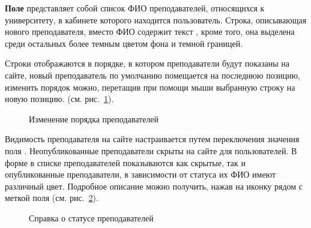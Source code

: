 \textbf{Поле } представляет собой список ФИО преподавателей, относящихся к университету, в кабинете которого находится пользователь. Строка, описывающая нового преподавателя, вместо ФИО содержит текст , кроме того, она выделена среди остальных более темным цветом фона и темной границей.


Строки отображаются в порядке, в котором преподаватели будут показаны на сайте, новый преподаватель по умолчанию помещается на последнюю позицию, изменить порядок можно, перетащив  при помощи мыши выбранную строку на новую позицию. (см. рис.~\ref{instructor:create_instructors}).
		
		\begin{figure}[H]
		\caption{Изменение порядка преподавателей}
		\label{instructor:create_instructors}
		\end{figure}	
		
Видимость преподавателя на сайте настраивается путем переключения значения поля . Неопубликованные преподаватели скрыты на сайте для пользователей. В форме в списке преподавателей показываются как скрытые, так и опубликованные преподаватели, в зависимости от статуса их ФИО имеют различный цвет. Подробное описание можно получить, нажав на иконку  рядом с меткой поля (см. рис.~\ref{instructor:create_instructors_legend}).
		
		\begin{figure}[H]
		\caption{Справка о статусе преподавателей}
		\label{instructor:create_instructors_legend}
		\end{figure}	
